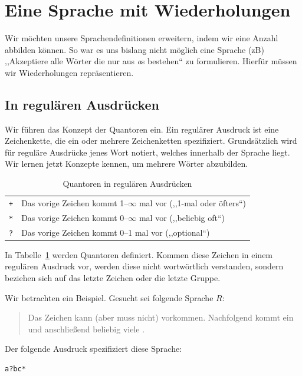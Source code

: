 \section{Eine Sprache mit Wiederholungen}
%
Wir möchten unsere Sprachendefinitionen erweitern, indem wir eine Anzahl abbilden können. So war es uns bislang nicht möglich eine Sprache (zB) ,,Akzeptiere alle Wörter die nur aus \emph{a}s bestehen`` zu formulieren. Hierfür müssen wir Wiederholungen repräsentieren.

\subsection{In regulären Ausdrücken}
%
Wir führen das Konzept der Quantoren ein. Ein regulärer Ausdruck ist eine Zeichenkette, die ein oder mehrere Zeichenketten spezifiziert. Grundsätzlich wird für reguläre Ausdrücke jenes Wort notiert, welches innerhalb der Sprache liegt. Wir lernen jetzt Konzepte kennen, um mehrere Wörter abzubilden.
%
\begin{table}[ht]
 \begin{center}
  \begin{tabular}{cl}
   \hline
    \texttt{+} & Das vorige Zeichen kommt 1--$\infty$ mal vor (,,1-mal oder öfters``) \\
    \texttt{*} & Das vorige Zeichen kommt 0--$\infty$ mal vor (,,beliebig oft``) \\
    \texttt{?} & Das vorige Zeichen kommt 0--1 mal vor (,,optional``) \\
   \hline
  \end{tabular}
  \caption{Quantoren in regulären Ausdrücken}
  \label{tab:quantifiers}
 \end{center}
\end{table}

In Tabelle~\ref{tab:quantifiers} werden Quantoren definiert. Kommen diese Zeichen in einem regulären Ausdruck vor, werden diese nicht wortwörtlich verstanden, sondern beziehen sich auf das letzte Zeichen oder die letzte Gruppe.

Wir betrachten ein Beispiel. Gesucht sei folgende Sprache $R$:
\begin{quote}
  Das Zeichen  kann (aber muss nicht) vorkommen. Nachfolgend kommt ein  und
  anschließend beliebig viele .
\end{quote}

Der folgende Ausdruck spezifiziert diese Sprache:
\begin{lstlisting}
a?bc*
\end{lstlisting}

